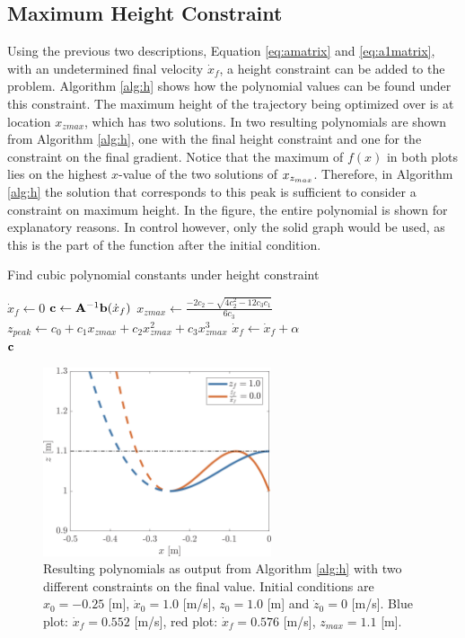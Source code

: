 \subsection{Maximum Height Constraint}
Using the previous two descriptions, Equation \ref{eq:amatrix} and \ref{eq:a1matrix}, with an undetermined final velocity $\dot{x}_f$, a height constraint can be added to the problem. Algorithm \ref{alg:h} shows how the polynomial values can be found under this constraint. The maximum height of the trajectory being optimized over is at location $x_{zmax}$, which has two solutions. In  two resulting polynomials are shown from Algorithm \ref{alg:h}, one with the final height constraint and one for the constraint on the final gradient. Notice that the maximum of $f(x)$ in both plots lies on the highest $x$-value of the two solutions of $x_{z_{max}}$. Therefore, in Algorithm \ref{alg:h} the solution that corresponds to this peak is sufficient to consider a constraint on maximum height. In the figure, the entire polynomial is shown for explanatory reasons. In control however, only the solid graph would be used, as this is the part of the function after the initial condition.
\begin{algorithm}
\caption{Find cubic polynomial constants under height constraint}
\label{alg:h}
\begin{algorithmic}[1]
    \State $\dot{x}_{f}\gets 0$
        \Repeat
            \State $\mathbf{c}\gets \mathbf{A}^{-1}\mathbf{b}(\dot{x}_{f})$ 
            \State $x_{zmax}\gets \frac{-2c_2 - \sqrt{4c_2^2-12c_3c_1}}{6c_3}$ 
            \State $z_{peak} \gets c_0 + c_1x_{zmax} + c_2x_{zmax}^2+ c_3x_{zmax}^3$ 
            \State $\dot{x}_{f} \gets \dot{x}_{f}+\alpha$   
        \\
    \Return $\mathbf{c}$
\end{algorithmic}
\end{algorithm}
\begin{figure}[h]
\centering
\includegraphics[width=0.6\textwidth]{STYLESTUFF/polynomialHeightViz.png}
\caption{Resulting polynomials as output from Algorithm \ref{alg:h} with two different constraints on the final value. Initial conditions are $x_0=-0.25$ [m], $\dot{x}_0=1.0$ [m/s], $z_0=1.0$ [m] and $\dot{z}_0=0$ [m/s]. Blue plot: $\dot{x}_f=0.552$ [m/s], red plot: $\dot{x}_f=0.576$ [m/s], $z_{max}=1.1$ [m]. }
\label{fig:polheight}
\end{figure}

